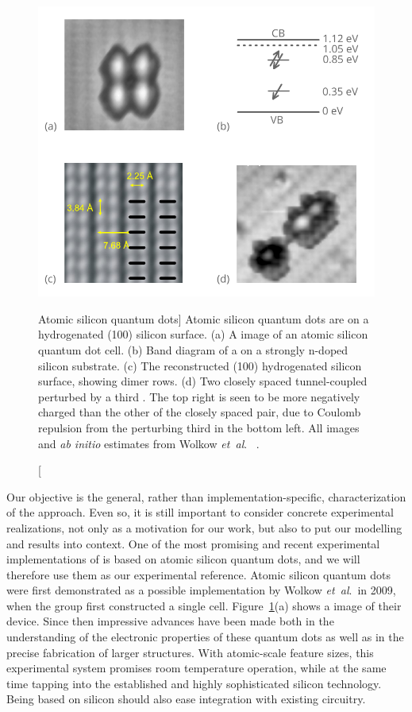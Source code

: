 \begin{figure}
  \center
  \includegraphics{silicon}
  \caption
[Atomic silicon quantum dots]
{
Atomic silicon quantum dots are \emph{} on a hydrogenated
(100) silicon surface. (a) A  image of an
atomic silicon quantum dot  cell. (b) Band diagram of a  on a strongly
n-doped silicon substrate. (c) The reconstructed (100) hydrogenated silicon
surface, showing dimer rows. (d) Two closely spaced tunnel-coupled  perturbed
by a third . The top right  is seen to be more negatively charged than the
other  of the closely spaced pair, due to Coulomb repulsion from the
perturbing third  in the bottom left. All  images and \emph{ab initio}
estimates from Wolkow \emph{et~al}.\ \cite{wolkow2013silicon} \cite{pitters2011tunnel}.
}
  \label{fig:silicon}
\end{figure}

Our objective is the general, rather than implementation-specific,
characterization of the  approach. Even so, it is still important to
consider concrete experimental realizations, not only as a motivation for our
work, but also to put our modelling and results into context. One of the most
promising and recent experimental implementations of  is based on
atomic silicon quantum dots, and we will therefore use them as our experimental
reference. Atomic silicon quantum dots were first demonstrated as a possible
 implementation by Wolkow \emph{et~al}.\ in 2009, when the group first
constructed a single  cell. Figure~\ref{fig:silicon}(a) shows a
 image of their device. Since then impressive advances have been made
both in the understanding of the electronic properties of these quantum dots as
well as in the precise fabrication of larger  structures. With
atomic-scale feature sizes, this experimental system promises room temperature
operation, while at the same time tapping into the established and highly
sophisticated silicon technology. Being based on silicon should also ease
integration with existing  circuitry.

